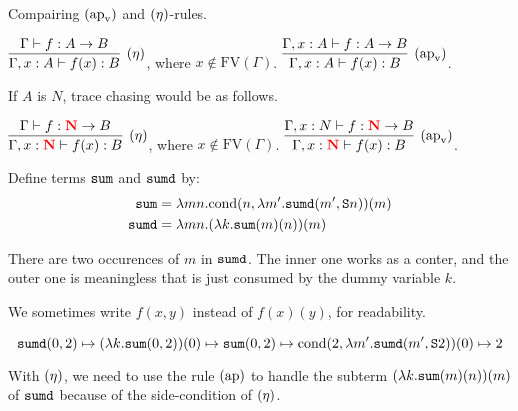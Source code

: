 \documentclass{article}
\newcommand{\bfColor}[2]{{\bf \color{#1}{#2}}}
\newcommand{\Rapv}{\hbox{$(\text{ap}_{\text{v}})$}}
\newcommand{\Reta}{\hbox{$(\eta)$}}
\newcommand{\Rap}{\hbox{$(\text{ap})$}}
\newcommand{\FV}[1]{\text{FV}(#1)}
\newcommand{\Sum}{{\tt sum}}
\newcommand{\Sumd}{{\tt sumd}}
\newcommand{\Cond}[2]{\text{cond}(#1,#2)}
\newcommand{\Suc}[1]{{\tt S}#1}
\newcommand{\N}{N}
\newcommand{\rN}{\bfColor{red}{N}}
\newenvironment{example}[1][Example]{\begin{trivlist}
\item[\hskip \labelsep {\bfseries #1}]}{\end{trivlist}}
\newenvironment{remark}[1][Remark]{\begin{trivlist}
\item[\hskip \labelsep {\bfseries #1}]}{\end{trivlist}}
\begin{document}
Compairing $\Rapv$ and $\Reta$-rules.
\begin{center}
  $\infer[\Reta]{
    \Gamma,x:A \vdash f(x):B
  }{
    \Gamma \vdash f:A\to B
  }$, where $x\not\in\FV{\Gamma}$. 
  \hspace{1cm}
  $\infer[\Rapv]{
    \Gamma, x:A \vdash f(x):B
  }{
    \Gamma, x:A \vdash f: A\to B
  }$. 
\end{center}

If $A$ is $\N$, trace chasing would be as follows. 

\begin{center}
  $\infer[\Reta]{
    \Gamma,x:\rN \vdash f(x):B
  }{
    \Gamma \vdash f:\rN\to B
  }$, where $x\not\in\FV{\Gamma}$. 
  \hspace{1cm}
  $\infer[\Rapv]{
    \Gamma, x:\rN \vdash f(x):B
  }{
    \Gamma, x:\N \vdash f: \rN\to B
  }$. 
\end{center}



Define terms $\Sum$ and $\Sumd$ by:
\begin{align*}
  \Sum &= \lambda mn.\Cond{n}{\lambda m'.\Sumd(m',\Suc{n})}(m)
  \\
  \Sumd &= \lambda mn.(\lambda k.\Sum(m)(n))(m)
\end{align*}

\begin{remark}\rm
  There are two occurences of $m$ in $\Sumd$.
  The inner one works as a conter,
  and the outer one is meaningless that is just consumed by the dummy variable $k$. 
\end{remark}

We sometimes write $f(x,y)$ instead of $f(x)(y)$, for readability. 
\\

\begin{example}
\[
\Sumd(0,2)
\mapsto
(\lambda k.\Sum(0,2))(0)
\mapsto
\Sum(0,2)
\mapsto
\Cond{2}{\lambda m'.\Sumd(m',\Suc{2})}(0)
\mapsto
2
\]
\end{example}

With $\Reta$, we need to use the rule $\Rap$ to handle
the subterm $(\lambda k.\Sum(m)(n))(m)$ of $\Sumd$
because of the side-condition of $\Reta$.
\end{document}

